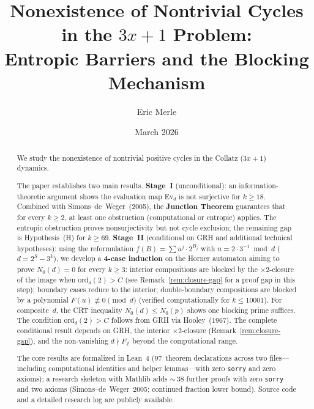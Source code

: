 \documentclass[12pt, a4paper]{amsart}
\title[Nonexistence of nontrivial cycles in Collatz]{%
  Nonexistence of Nontrivial Cycles in the $3x+1$ Problem:\\
  Entropic Barriers and the Blocking Mechanism}
\author{Eric Merle}
\date{March 2026}
\theoremstyle{plain}
\theoremstyle{definition}
\theoremstyle{remark}
\newcommand{\Z}{\mathbb{Z}}
\newcommand{\Ev}{\mathrm{Ev}}
\newcommand{\ord}{\mathrm{ord}}
\begin{document}
\begin{abstract}
  We study the nonexistence of nontrivial positive cycles
  in the Collatz ($3x+1$) dynamics.

  The paper establishes two main results.
  \textbf{Stage~I} (unconditional): an information-theoretic
  argument shows the evaluation map $\Ev_d$ is not surjective
  for $k \geq 18$. Combined with Simons--de~Weger~(2005), the
  \textbf{Junction Theorem} guarantees that for every
  $k \geq 2$, at least one obstruction (computational or
  entropic) applies. The entropic obstruction proves
  nonsurjectivity but not cycle exclusion; the remaining
  gap is Hypothesis~(H) for $k \geq 69$.
  \textbf{Stage~II} (conditional on GRH and additional
  technical hypotheses): using the reformulation
  $f(B) = \sum u^j \cdot 2^{B_j}$ with
  $u = 2 \cdot 3^{-1} \bmod d$ ($d = 2^S - 3^k$),
  we develop a \textbf{4-case induction} on the Horner
  automaton aiming to prove $N_0(d) = 0$ for every
  $k \geq 3$:
  interior compositions are blocked by the
  $\times 2$-closure of the image when $\ord_d(2) > C$
  (see Remark~\ref{rem:closure-gap} for a proof gap
  in this step);
  boundary cases reduce to the interior; double-boundary
  compositions are blocked by a polynomial
  $F(u) \not\equiv 0 \pmod{d}$
  (verified computationally for $k \leq 10001$).
  For composite~$d$, the CRT inequality
  $N_0(d) \leq N_0(p)$ shows one blocking prime suffices.
  The condition $\ord_d(2) > C$ follows from GRH via
  Hooley~(1967).
  The complete conditional result depends on GRH, the
  interior $\times 2$-closure (Remark~\ref{rem:closure-gap}),
  and the non-vanishing $d \nmid F_\Z$ beyond the
  computational range.

  The core results are formalized in Lean~4
  ($97$~theorem declarations across two files---including
  computational identities and helper lemmas---with
  zero \texttt{sorry} and zero axioms);
  a research skeleton with Mathlib adds
  ${\sim}\,38$ further proofs with zero \texttt{sorry}
  and two axioms (Simons--de~Weger~2005; continued fraction
  lower bound).
  Source code and a detailed research log are publicly
  available.
\end{abstract}

\maketitle

\tableofcontents

\end{document}

